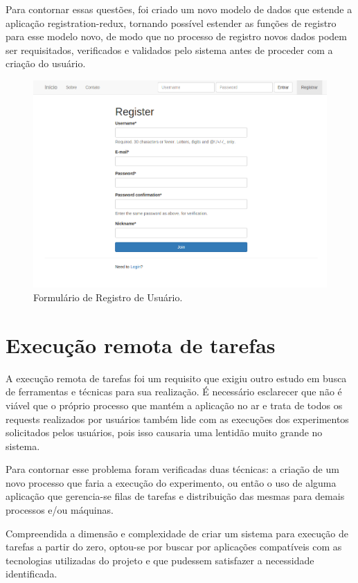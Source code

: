 \documentclass[tg]{mdtufsm}
\begin{document}
Para contornar essas questões, foi criado um novo modelo de dados que estende a aplicação registration-redux, tornando possível estender as funções de registro para esse modelo novo, de modo que no processo de registro novos dados podem ser requisitados, verificados e validados pelo sistema antes de proceder com a criação do usuário.

\begin{figure}
	\centering
	\includegraphics[width=1\textwidth]{registro}
	\caption{
		Formulário de Registro de Usuário.
	}
	\label{fig:home}
\end{figure}

\section{Execução remota de tarefas}
A execução remota de tarefas foi um requisito que exigiu outro estudo em busca de ferramentas e técnicas para sua realização. É necessário esclarecer que não é viável que o próprio processo que mantém a aplicação no ar e trata de todos os requests realizados por usuários também lide com as execuções dos experimentos solicitados pelos usuários, pois isso causaria uma lentidão muito grande no sistema.

Para contornar esse problema foram verificadas duas técnicas: a criação de um novo processo que faria a execução do experimento, ou então o uso de alguma aplicação que gerencia-se filas de tarefas e distribuição das mesmas para demais processos e/ou máquinas.

Compreendida a dimensão e complexidade de criar um sistema para execução de tarefas a partir do zero, optou-se por buscar por aplicações compatíveis com as tecnologias utilizadas do projeto e que pudessem satisfazer a necessidade identificada.
\end{document}

